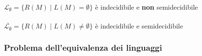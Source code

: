 \documentclass{article}  %
\theoremstyle{definition}
\begin{document}
\begin{osservazioni}
	$\mathcal{L}_{\emptyset} = \{R(M) \mid L(M)= \emptyset \}$ è indecidibile e \textbf{non} semidecidibile \\ \\
	$\overline{\mathcal{L}_{\emptyset}} = \{R(M) \mid L(M) \neq \emptyset \}$ è indecidibile e semidecidibile
\end{osservazioni}
\subsubsection{Problema dell'equivalenza dei linguaggi}
\end{document}
